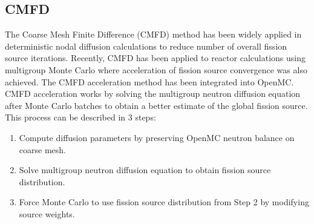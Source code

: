 \documentclass{ansconf}
\begin{document}
\subsection{CMFD}

The Coarse Mesh Finite Difference (CMFD) method has been widely applied in
deterministic nodal diffusion calculations to reduce number of overall fission
source iterations. Recently, CMFD has been applied to reactor calculations using
multigroup Monte Carlo \cite{physor-lee-2012} where acceleration of fission
source convergence was also achieved. The CMFD acceleration method has been
integrated into OpenMC. CMFD acceleration works by solving the multigroup
neutron diffusion equation after Monte Carlo batches to obtain a better estimate
of the global fission source.  This process can be described in 3 steps:
\begin{enumerate}
 \item Compute diffusion parameters by preserving OpenMC neutron balance on
   coarse mesh.
 \item Solve multigroup neutron diffusion equation to obtain fission source
   distribution.
 \item Force Monte Carlo to use fission source distribution from Step 2 by
   modifying source weights.
\end{enumerate}
\end{document}
